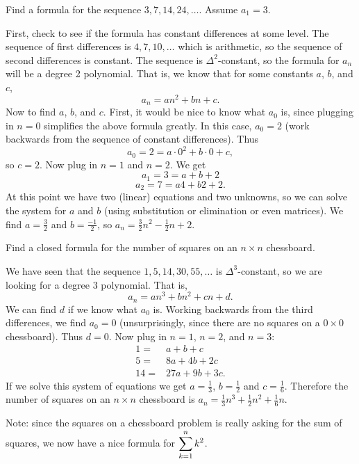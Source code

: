\documentclass[12pt]{article}
\begin{document}
\begin{example}
  Find a formula for the sequence $3, 7, 14, 24,\ldots$. Assume $a_1 = 3$.  
  \begin{solution}
    First, check to see if the formula has constant differences at some level.  The sequence of first differences is $4, 7, 10, \ldots$ which is arithmetic, so the sequence of second differences is constant.  The sequence is $\Delta^2$-constant, so the formula for $a_n$ will be a degree 2 polynomial.  That is, we know that for some constants $a$, $b$, and $c$,
    \[a_n = an^2 + bn + c.\]
    Now to find $a$, $b$, and $c$.  First, it would be nice to know what $a_0$ is, since plugging in $n = 0$ simplifies the above formula greatly.  In this case, $a_0 = 2$ (work backwards from the sequence of constant differences).  Thus
    \[a_0 = 2 = a\cdot 0^2 + b \cdot 0 + c,\]
    so $c = 2$.  Now plug in $n =1$ and $n = 2$.  We get 
    \[a_1 = 3 = a + b + 2\]
    \[a_2 = 7 = a4 + b 2 + 2.\]  At this point we have two (linear) equations and two unknowns, so we can solve the system for $a$ and $b$ (using substitution or elimination or even matrices).  We find $a = \frac{3}{2}$ and $b = \frac{-1}{2}$, so $a_n = \frac{3}{2} n^2 - \frac{1}{2}n + 2$.
  \end{solution}

\end{example}


\begin{example}
  Find a closed formula for the number of squares on an $n \times n$ chessboard.
  \begin{solution}
    We have seen that the sequence $1, 5, 14, 30, 55, \ldots$ is $\Delta^3$-constant, so we are looking for a degree 3 polynomial.  That is, 
    \[a_n = an^3 + bn^2 + cn + d.\]
    We can find $d$ if we know what $a_0$ is.  Working backwards from the third differences, we find $a_0 = 0$ (unsurprisingly, since there are no squares on a $0\times 0$ chessboard).  Thus $d = 0$.  Now plug in $n = 1$, $n =2$, and $n =3$:
    \begin{align*}
      1 = & a + b + c \\
      5 = & 8a + 4b + 2c \\
      14 = & 27a + 9b + 3c.
    \end{align*}
    If we solve this system of equations we get $a = \frac{1}{3}$, $b = \frac{1}{2}$ and $c = \frac{1}{6}$.  Therefore the number of squares on an $n \times n$ chessboard is $a_n = \frac{1}{3}n^3 + \frac{1}{2}n^2 + \frac{1}{6}n$.
  \end{solution}
  
  Note: since the squares on a chessboard problem is really asking for the sum of squares, we now have a nice formula for $\displaystyle\sum_{k=1}^n k^2$.
\end{example}
\end{document}
